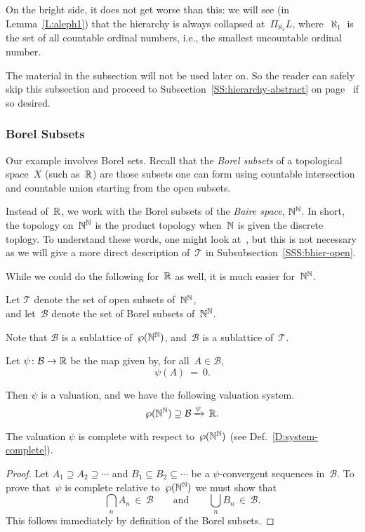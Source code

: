 \documentclass[main.tex]{subfiles}
\begin{document}
On the bright side,
it does not get worse than this:
we will see 
(in Lemma~\ref{L:aleph1})
that 
the hierarchy is always collapsed at~$\Pi_{\aleph_1} L$,
where~$\aleph_1$
is the set of all countable ordinal numbers,
i.e., the smallest uncountable ordinal number.

The material in the subsection will not be used later on.
So the reader can safely skip this subsection
and proceed to Subsection~\ref{SS:hierarchy-abstract} 
on page~\pageref{SS:hierarchy-abstract}
if so desired.

\subsubsection{Borel Subsets}$\,$\\
Our example involves Borel sets.
Recall that the \emph{Borel subsets}
of a topological space~$X$
(such as~$\mathbb{R}$)
are those subsets one can form using countable intersection
and countable union starting from the open subsets.

Instead of~$\mathbb{R}$,
we  work with the Borel subsets
of the 
 \emph{Baire space},
 $\mathbb{N}^{\mathbb{N}}$.
In short,
the topology on~$\mathbb{N}^{\mathbb{N}}$
is the product topology
when~$\mathbb{N}$ is given the discrete toplogy.
To understand these words,
one might look at~\cite{Willard70},
but this is not necessary as we will
give a more direct description of~$\mathcal{T}$
in Subsubsection~\ref{SSS:bhier-open}.

While we could do the following
for~$\mathbb{R}$ as well,
it is much easier for~$\mathbb{N}^{\mathbb{N}}$.
\begin{nt}
Let $\mathcal{T}$
denote the set of open subsets of~$\mathbb{N}^{\mathbb{N}}$, \\
and let~$\mathcal{B}$
denote the set of Borel subsets of~$\mathbb{N}^{\mathbb{N}}$.
\end{nt}
Note that $\mathcal{B}$
is a sublattice of~$\wp(\mathbb{N}^{\mathbb{N}})$,
and~$\mathcal{B}$ is a sublattice of~$\mathcal{T}$.

\begin{dfn}
Let $\psi\colon \mathcal{B}\rightarrow \mathbb{R}$
be the map given by, for all~$A\in \mathcal{B}$,
\begin{equation*}
\psi(A)\ =\ 0.
\end{equation*}
\end{dfn}
Then $\psi$ is a valuation,
and we have the following valuation system.
\begin{equation*}
\wp(\mathbb{N}^{\mathbb{N}}) \supseteq \mathcal{B}\,\smash{\xrightarrow{\psi}\,\mathbb{R}}.
\end{equation*}

\begin{lem}
The valuation $\psi$ is complete with respect to~$\wp(\mathbb{N}^{\mathbb{N}})$
(see Def.~\ref{D:system-complete}).
\end{lem}
\begin{proof}
Let $A_1 \supseteq A_2 \supseteq \dotsb$
and $B_1 \subseteq B_2 \subseteq \dotsb$
be a $\psi$-convergent sequences in~$\mathcal{B}$.
To prove that~$\psi$ is complete relative to~$\wp(\mathbb{N}^{\mathbb{N}})$
we must show that 
\begin{equation*}
\textstyle 
\bigcap_n A_n \,\in\, \mathcal{B}
\qquad\text{and}\qquad
\bigcup_n B_n \,\in\, \mathcal{B}.
\end{equation*}
This follows immediately by definition of
the Borel subsets.
\end{proof}
\end{document}
